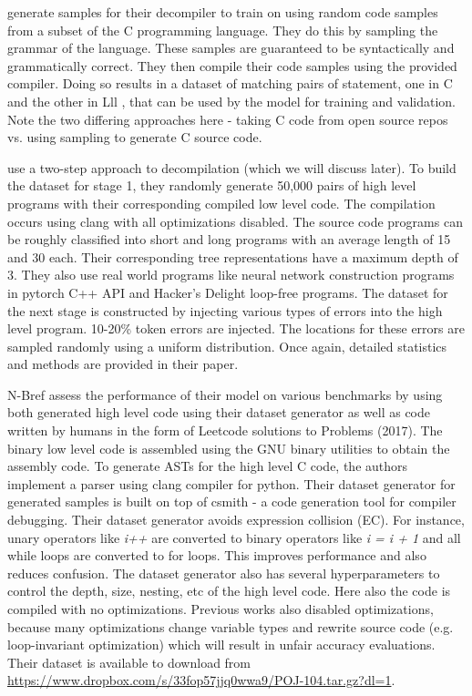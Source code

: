 \documentclass{article}
\begin{document}
\citet{katz2019towards} generate samples for their decompiler to train on using random code samples from a subset of the C programming language. They do this by sampling the grammar of the language. These samples are guaranteed to be syntactically and grammatically correct. They then compile their code samples using the provided compiler. Doing so results in a dataset of matching pairs of statement, one in C and the other in Lll , that can be used by the model for training and validation. Note the two differing approaches here - taking C code from open source repos vs. using sampling to generate C source code. 

\citet{coda} use a two-step approach to decompilation (which we will discuss later). To build the dataset for stage 1, they randomly generate 50,000 pairs of high level programs with their corresponding compiled low level code. The compilation occurs using clang with all optimizations disabled. The source code programs can be roughly classified into short and long programs with an average length of 15 and 30 each. Their corresponding tree representations have a maximum depth of 3. They also use real world programs like neural network construction programs in pytorch C++ API and Hacker’s Delight loop-free programs. The dataset for the next stage is constructed by injecting various types of errors into the high level program. 10-20\% token errors are injected. The locations for these errors are sampled randomly using a uniform distribution. Once again, detailed statistics and methods are provided in their paper.

N-Bref \cite{nbref} assess the performance of their model on various benchmarks by using both generated high level code using their dataset generator as well as code written by humans in the form of Leetcode solutions to Problems (2017). The binary low level code is assembled using the GNU binary utilities to obtain the assembly code. To generate ASTs for the high level C code, the authors implement a parser using clang compiler for python. Their dataset generator for generated samples is built on top of csmith \cite{yang2011finding} - a code generation tool for compiler debugging. Their dataset generator avoids expression collision (EC). For instance, unary operators like \textit{i++} are converted to binary operators like \textit{i = i + 1} and all while loops are converted to for loops. This improves performance and also reduces confusion. The dataset generator also has several hyperparameters to control the depth, size, nesting, etc of the high level code. Here also the code is compiled with no optimizations. Previous works \cite{brumley2013native,lee2011tie,lin2010automatic} also
disabled optimizations, because many optimizations change variable types and rewrite source code
(e.g. loop-invariant optimization) which will result in unfair accuracy evaluations. Their dataset is available to download from \url{https://www.dropbox.com/s/33fop57jjq0wwa9/POJ-104.tar.gz?dl=1}.
\end{document}
